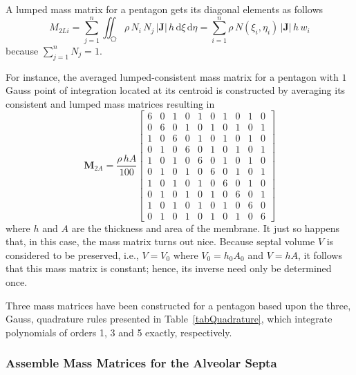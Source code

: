 A lumped mass matrix for a pentagon gets its diagonal elements as follows
\begin{equation}
{M}_{2Li} = \sum_{j=1}^n \iint_{\pentagon} \rho \, N_i \, N_j \, |\mathbf{J}| \, h \,  \mathrm{d} \xi \, \mathrm{d} \eta =  \sum_{i=1}^n  \rho  \, N ( \xi_i , \eta_i ) \, |\mathbf{J}| \, h \, w_i
\label{LumMass2D}
\end{equation}
because $\sum_{j=1}^n N_j = 1$. 

For instance, the averaged lumped-consistent mass matrix for a pentagon with $1$ Gauss point of integration located at its centroid is constructed by averaging its consistent and lumped mass matrices resulting in
\begin{equation}
\mathbf{M}_{2A}  = \frac{\rho \, h A}{100}
\begin{bmatrix}
6 & 0 & 1 & 0 & 1 & 0 & 1 & 0 & 1 & 0 \\
0 & 6 & 0 & 1 & 0 & 1 & 0 & 1 & 0 & 1 \\
1 & 0 & 6 & 0 & 1 & 0 & 1 & 0 & 1 & 0 \\
0 & 1 & 0 & 6 & 0 & 1 & 0 & 1 & 0 & 1 \\
1 & 0 & 1 & 0 & 6 & 0 & 1 & 0 & 1 & 0 \\
0 & 1 & 0 & 1 & 0 & 6 & 0 & 1 & 0 & 1 \\
1 & 0 & 1 & 0 & 1 & 0 & 6 & 0 & 1 & 0 \\
0 & 1 & 0 & 1 & 0 & 1 & 0 & 6 & 0 & 1 \\
1 & 0 & 1 & 0 & 1 & 0 & 1 & 0 & 6 & 0 \\
0 & 1 & 0 & 1 & 0 & 1 & 0 & 1 & 0 & 6 
\end{bmatrix} 
\label{LumconsMassMatrix2D}
\end{equation}
where $h$ and $A$ are the thickness and area of the membrane.  It just so happens that, in this case, the mass matrix turns out nice.  Because septal volume $V$ is considered to be preserved, i.e., $V = V_0$ where $V_0 = h_0 A_0$ and $V = h A$, it follows that this mass matrix is constant; hence, its inverse need only be determined once.

Three mass matrices have been constructed for a pentagon based upon the three, Gauss, quadrature rules presented in Table~\ref{tabQuadrature}, which integrate polynomials of orders 1, 3 and 5 exactly, respectively. 

\subsubsection{Assemble Mass Matrices for the Alveolar Septa}


